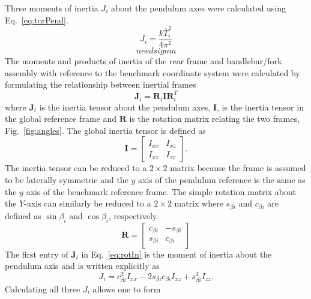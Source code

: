 \documentclass{bmd2010p}
\begin{document}
Three moments of inertia $J_{i}$ about the pendulum axes were calculated using
Eq.~\ref{eq:torPend}.
\begin{equation}
	J_i=\frac{k\overline{T}_i^2}{4\pi^2}
\label{eq:torPend}
\end{equation}
\begin{equation}
    need sigma
\end{equation}
The moments and products of inertia of the rear frame and handlebar/fork
assembly with reference to the benchmark coordinate system were calculated by
formulating the relationship between inertial frames
\begin{equation}
	\mathbf{J}_i=\mathbf{R}_i\mathbf{IR}_i^T
\label{eq:rotIn}
\end{equation}
where $\mathbf{J}_i$ is the inertia tensor about the pendulum axes,
$\mathbf{I}$, is the inertia tensor in the global reference frame and
$\mathbf{R}$ is the rotation matrix relating the two frames,
Fig.~\ref{fig:angles}. The global inertia
tensor is defined as
\begin{equation}
	\mathbf{I}=
	\left[
	\begin{array}{rr}
		I_{xx}  & I_{xz}\\
		I_{xz} & I_{zz}
	\end{array}
	\right]\textrm{.}
	\label{eq:MoI}
\end{equation}
The inertia tensor can be reduced to a $2\times2$ matrix because the frame is
assumed to be laterally symmetric and the $y$ axis of the pendulum reference is
the same as the $y$ axis of the benchmark reference frame. The simple rotation
matrix about the $Y$-axis
can similarly be reduced to a $2\times2$ matrix where $s_{\beta i}$ and
$c_{\beta i}$ are defined as $\sin{\beta_i}$ and $\cos{\beta_i}$,
respectively.
\begin{equation}
	\mathbf{R}=
	\left[
	\begin{array}{rr}
		c_{\beta i} & -s_{\beta i}\\
		s_{\beta i} & c_{\beta i}
	\end{array}
	\right]
	\label{eq:rotMat}
\end{equation}
The first entry of $\mathbf{J}_i$ in Eq.~\ref{eq:rotIn} is the moment of
inertia about the pendulum axis and is written explicitly as
\begin{equation}
	J_{i}=c^{2}_{\beta i}I_{xx}-2s_{\beta i}c_{\beta i}I_{xz}+s^{2}_{\beta i}I_{zz}\textrm{.}
\label{eq:inRelComp}
\end{equation}
Calculating all three $J_{i}$ allows one to form
\end{document}
